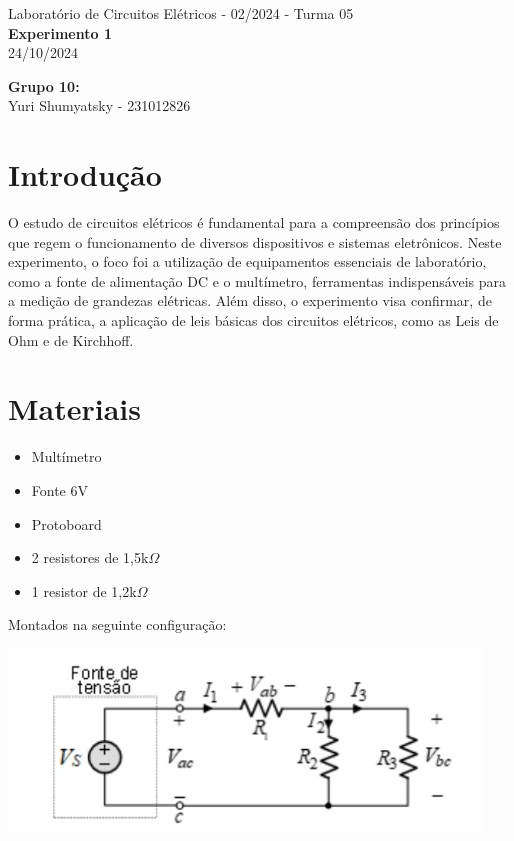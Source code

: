 \documentclass[a4 paper]{article}
\newcommand{\parag}{\hspace{30pt}}
\begin{document}
\justifying
\begin{center}{\large Laboratório de Circuitos Elétricos - 02/2024 - Turma 05}\\
{\large \textbf{Experimento 1}}\\ 
24/10/2024
\end{center}

\vspace{500pt}
 \noindent\textbf{Grupo 10:}\\
 Yuri Shumyatsky - 231012826


\vspace{30pt}
\newpage

\section{Introdução}
\parag O estudo de circuitos elétricos é fundamental para a compreensão dos princípios que regem o funcionamento de diversos dispositivos e sistemas eletrônicos. Neste experimento, o foco foi a utilização de equipamentos essenciais de laboratório, como a fonte de alimentação DC e o multímetro, ferramentas indispensáveis para a medição de grandezas elétricas. Além disso, o experimento visa confirmar, de forma prática, a aplicação de leis básicas dos circuitos elétricos, como as Leis de Ohm e de Kirchhoff. 

\section{Materiais}
\begin{itemize}
\item Multímetro
\item Fonte 6V
\item Protoboard
\item 2 resistores de 1,5k$\Omega$
\item 1 resistor de 1,2k$\Omega$
\end{itemize}
Montados na seguinte configuração:
\begin{table}[h]
\centering
\includegraphics{figuras/circuito1}
\end{table}
\end{document}
